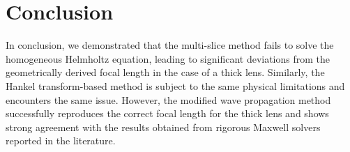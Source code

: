 \documentclass[a4paper,12pt]{article}
\begin{document}
\section{Conclusion}
In conclusion, we demonstrated that the multi-slice method fails to solve the homogeneous Helmholtz equation, leading to significant deviations from the geometrically derived focal length in the case of a thick lens. Similarly, the Hankel transform-based method is subject to the same physical limitations and encounters the same issue. 
However, the modified wave propagation method successfully reproduces the correct focal length for the thick lens and shows strong agreement with the results obtained from rigorous Maxwell solvers reported in the literature.

\printbibliography
\end{document}
